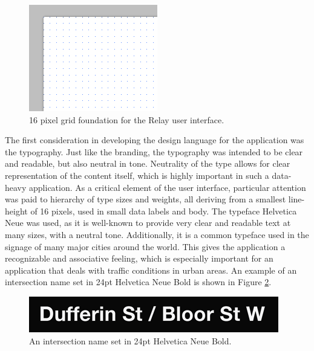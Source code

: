 \documentclass{report}
\begin{document}
\begin{figure}[htbp!]
  \begin{centering}
    \includegraphics[scale=1]{figures/dot-grid.png}
    \caption{16 pixel grid foundation for the Relay user interface.}
    \label{fig:dot-grid}
  \end{centering}
\end{figure}

The first consideration in developing the design language for the application was the typography.
Just like the branding, the typography was intended to be clear and readable, but also neutral in tone.
Neutrality of the type allows for clear representation of the content itself, which is highly important in such a data-heavy application.
As a critical element of the user interface, particular attention was paid to hierarchy of type sizes and weights, all deriving from a smallest line-height of 16 pixels, used in small data labels and body.
The typeface Helvetica Neue was used, as it is well-known to provide very clear and readable text at many sizes, with a neutral tone.
Additionally, it is a common typeface used in the signage of many major cities around the world.
This gives the application a recognizable and associative feeling, which is especially important for an application that deals with traffic conditions in urban areas.
An example of an intersection name set in 24pt Helvetica Neue Bold is shown in Figure \ref{fig:name}. \\

\begin{figure}[htbp!]
  \begin{centering}
    \includegraphics[scale=1]{figures/name.png}
    \caption{An intersection name set in 24pt Helvetica Neue Bold.}
    \label{fig:name}
  \end{centering}
\end{figure}
\end{document}
